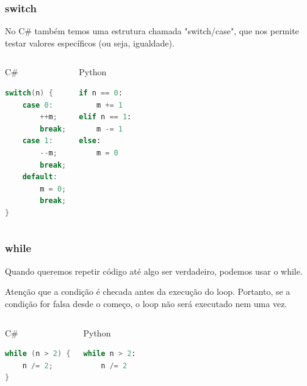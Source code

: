 \documentclass{beamer}
\begin{document}
	\begin{frame}[fragile]
		\frametitle{switch}

		No C\# também temos uma estrutura chamada "switch/case", que nos
		permite testar valores específicos (ou seja, igualdade).

		\begin{columns}
			\begin{block}{C\#}
				\begin{lstlisting}[language=Java,basicstyle=\ttfamily,keywordstyle=\color{blue}]
switch(n) {
	case 0:
		++m;
		break;
	case 1:
		--m;
		break;
	default:
		m = 0;
		break;
}
				\end{lstlisting}
			\end{block}
			\begin{block}{Python}
				\begin{lstlisting}[language=Python,basicstyle=\ttfamily,keywordstyle=\color{blue}]
if n == 0:
	m += 1
elif n == 1:
	m -= 1
else:
	m = 0
				\end{lstlisting}
			\end{block}
		\end{columns}
	\end{frame}

	\begin{frame}[fragile]
		\frametitle{while}

		Quando queremos repetir código até algo ser verdadeiro, podemos usar o
		while.

		Atenção que a condição é checada antes da execução do loop. Portanto,
		se a condição for falsa desde o começo, o loop não será executado nem
		uma vez.

		\begin{columns}
			\column{0.49\textwidth}
			\begin{block}{C\#}
				\begin{lstlisting}[language=Java,basicstyle=\ttfamily,keywordstyle=\color{blue}]
while (n > 2) {
	n /= 2;
}
				\end{lstlisting}
			\end{block}
			\column{0.45\textwidth}
			\begin{block}{Python}
				\begin{lstlisting}[language=Python,basicstyle=\ttfamily,keywordstyle=\color{blue}]
while n > 2:
	n /= 2
				\end{lstlisting}
			\end{block}
		\end{columns}
	\end{frame}
\end{document}
